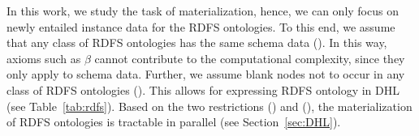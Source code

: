 In this work, we study the task of materialization, hence, we can only focus on
newly entailed instance data for the RDFS ontologies. To this end,
we assume that any class of RDFS ontologies has the same schema data (\uppercase\expandafter{}). In this way,
axioms such as $\beta$ cannot contribute to the computational complexity, since they
only apply to schema data. Further, we assume blank nodes not to occur in
any class of RDFS ontologies
(\uppercase\expandafter{}). This allows for expressing RDFS ontology
in DHL (see Table~\ref{tab:rdfs}). Based on the two restrictions (\uppercase\expandafter{})
and (\uppercase\expandafter{}), the materialization of RDFS ontologies
is tractable in parallel (see Section~\ref{sec:DHL}).




